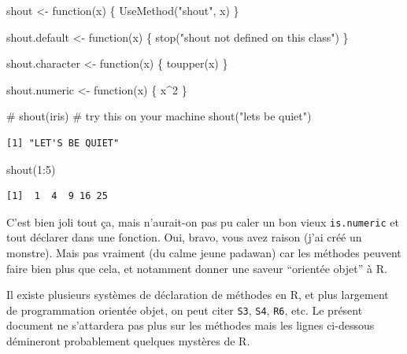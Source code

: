 \documentclass[
  letterpaper,
  DIV=11,
  numbers=noendperiod]{scrreprt}
\newenvironment{Shaded}{\begin{snugshade}}{\end{snugshade}}
\newcommand{\CommentTok}[1]{\textcolor[rgb]{0.37,0.37,0.37}{#1}}
\newcommand{\ControlFlowTok}[1]{\textcolor[rgb]{0.00,0.23,0.31}{#1}}
\newcommand{\DecValTok}[1]{\textcolor[rgb]{0.68,0.00,0.00}{#1}}
\newcommand{\FunctionTok}[1]{\textcolor[rgb]{0.28,0.35,0.67}{#1}}
\newcommand{\NormalTok}[1]{\textcolor[rgb]{0.00,0.23,0.31}{#1}}
\newcommand{\OtherTok}[1]{\textcolor[rgb]{0.00,0.23,0.31}{#1}}
\newcommand{\SpecialCharTok}[1]{\textcolor[rgb]{0.37,0.37,0.37}{#1}}
\newcommand{\StringTok}[1]{\textcolor[rgb]{0.13,0.47,0.30}{#1}}
\begin{document}
\begin{Shaded}
\begin{Highlighting}[]
\NormalTok{shout }\OtherTok{\textless{}{-}} \ControlFlowTok{function}\NormalTok{(x) \{}
  \FunctionTok{UseMethod}\NormalTok{(}\StringTok{"shout"}\NormalTok{, x)}
\NormalTok{\}}

\NormalTok{shout.default }\OtherTok{\textless{}{-}} \ControlFlowTok{function}\NormalTok{(x) \{}
  \FunctionTok{stop}\NormalTok{(}\StringTok{"\textquotesingle{}shout\textquotesingle{} not defined on this class"}\NormalTok{)}
\NormalTok{\}}

\NormalTok{shout.character }\OtherTok{\textless{}{-}} \ControlFlowTok{function}\NormalTok{(x) \{}
  \FunctionTok{toupper}\NormalTok{(x)}
\NormalTok{\}}

\NormalTok{shout.numeric }\OtherTok{\textless{}{-}} \ControlFlowTok{function}\NormalTok{(x) \{}
\NormalTok{  x}\SpecialCharTok{\^{}}\DecValTok{2}
\NormalTok{\}}

\CommentTok{\# shout(iris) \# try this on your machine}
\FunctionTok{shout}\NormalTok{(}\StringTok{"let\textquotesingle{}s be quiet"}\NormalTok{)}
\end{Highlighting}
\end{Shaded}

\begin{verbatim}
[1] "LET'S BE QUIET"
\end{verbatim}

\begin{Shaded}
\begin{Highlighting}[]
\FunctionTok{shout}\NormalTok{(}\DecValTok{1}\SpecialCharTok{:}\DecValTok{5}\NormalTok{)}
\end{Highlighting}
\end{Shaded}

\begin{verbatim}
[1]  1  4  9 16 25
\end{verbatim}

C'est bien joli tout ça, mais n'aurait-on pas pu caler un bon vieux
\texttt{is.numeric} et tout déclarer dans une fonction. Oui, bravo, vous
avez raison (j'ai créé un monstre). Mais pas vraiment (du calme jeune
padawan) car les méthodes peuvent faire bien plus que cela, et notamment
donner une saveur ``orientée objet'' à R.

Il existe plusieurs systèmes de déclaration de méthodes en R, et plus
largement de programmation orientée objet, on peut citer \texttt{S3},
\texttt{S4}, \texttt{R6}, etc. Le présent document ne s'attardera pas
plus sur les méthodes mais les lignes ci-dessous démineront probablement
quelques mystères de R.
\end{document}
